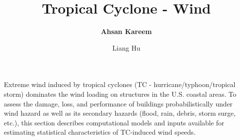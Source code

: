 %
%
%


%
%
%
%
%
%
%
%

\title{Tropical Cyclone - Wind}
\author{
    \textbf{Ahsan Kareem} 
    \and Liang Hu}
\tocauthor{}
%
%
\maketitle

Extreme wind induced by tropical cyclones (TC - hurricane/typhoon/tropical storm) dominates the wind loading on structures in the U.S. coastal areas. To assess the damage, loss, and performance of buildings probabilistically under wind hazard as well as its secondary hazards (flood, rain, debris, storm surge, etc.), this section describes computational models and inputs available for estimating statistical characteristics of TC-induced wind speeds. 

